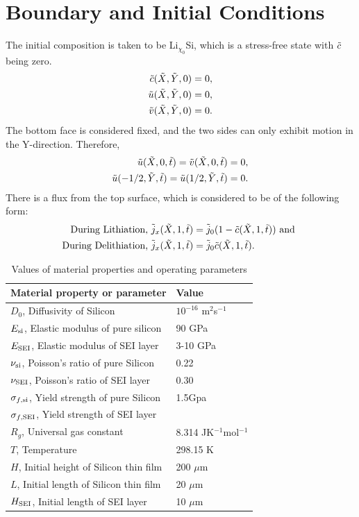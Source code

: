 \section{Boundary and Initial Conditions}
The initial composition is taken to be Li$_{\chi_{0}}$Si, which is a stress-free state with $\tilde{c}$ being zero.
\begin{align}
    \tilde{c}(\tilde{X}, \tilde{Y}, 0) = 0, \\
    \tilde{u}(\tilde{X}, \tilde{Y}, 0) = 0,\\
    \tilde{v}(\tilde{X}, \tilde{Y}, 0) = 0.
\end{align}
The bottom face is considered fixed, and the two sides can only exhibit motion in the Y-direction. Therefore,
\begin{align}
    \tilde{u}(\tilde{X}, 0, \tilde{t}) = \tilde{v}(\tilde{X}, 0, \tilde{t}) = 0, \\
    \tilde{u}(-1/2, \tilde{Y}, \tilde{t}) =  \tilde{u}(1/2, \tilde{Y}, \tilde{t}) = 0.
\end{align}
There is a flux from the top surface, which is considered to be of the following form: 
\begin{align}
    \text{During Lithiation, }\tilde{j}_x(\tilde{X}, 1, \tilde{t}) &= \tilde{j}_0 (1 - \tilde{c}(\tilde{X}, 1, \tilde{t})) \text{ and } \\
    \text{During Delithiation, }\tilde{j}_x(\tilde{X}, 1, \tilde{t}) &= \tilde{j}_0 \tilde{c}(\tilde{X}, 1, \tilde{t}).
\end{align} 
\vspace{4em}
\begin{table}[H]
\caption{Values of material properties and operating parameters}
\vspace{1em}
\begin{tabularx}{\textwidth}{Xl}
\hline
 {Material property or parameter} & {Value} \\
\hline
$D_0$, Diffusivity of Silicon & $10^{-16}$ m$^{2}$s$^{-1}$ \\
$E_{{\rm{si}}}$, Elastic modulus of pure silicon & 90 GPa \\
$E_{\rm{SEI}}$, Elastic modulus of SEI layer & 3-10 GPa \\
$\nu_{{\rm{si}}}$, Poisson's ratio of pure Silicon & 0.22\\
$\nu_{\rm{SEI}}$, Poisson's ratio of SEI layer & 0.30\\
$\sigma_{f,{\rm{si}}}$, Yield strength of pure Silicon & 1.5Gpa\\
$\sigma_{f, {\rm{SEI}}}$, Yield strength of SEI layer & \\
$R_g$, Universal gas constant & 8.314 JK$^{-1}$mol$^{-1}$\\
$T$, Temperature & 298.15 K\\
$H$, Initial height of Silicon thin film & 200 $\mu$m\\
$L$, Initial length of Silicon thin film & 20 $\mu$m\\
$H_{\rm{SEI}}$, Initial length of SEI layer & 10 $\mu$m
\end{tabularx}
\end{table}

